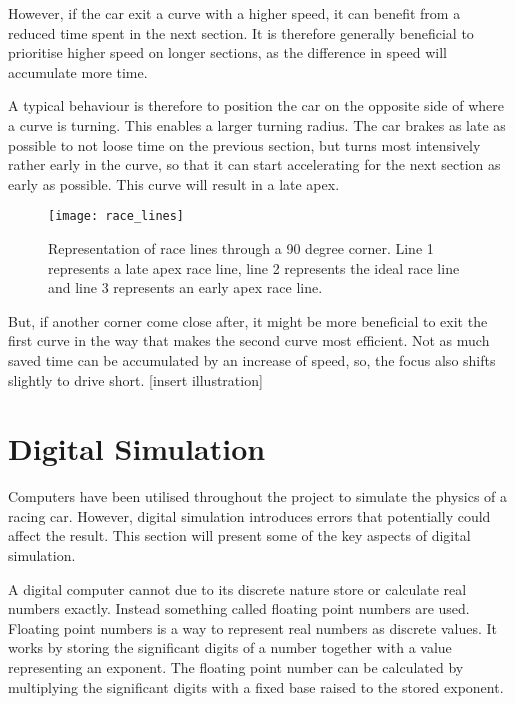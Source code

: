 However, if the car exit a curve with a higher speed, it can benefit from a reduced time spent in the next section. It is therefore generally beneficial to prioritise higher speed on longer sections\cite{beckman:racing_line_intro}, as the difference in speed will accumulate more time.

A typical behaviour is therefore to position the car on the opposite side of where a curve is turning. This enables a larger turning radius. The car brakes as late as possible to not loose time on the previous section, but turns most intensively rather early in the curve, so that it can start accelerating for the next section as early as possible. This curve will result in a late apex.

\begin{figure}[H]
    \centering
    \texttt{[image: race\_lines]}
    \caption{Representation of race lines through a 90 degree corner. Line 1 represents a late apex race line, line 2 represents the ideal race line and line 3 represents an early apex race line.}
\end{figure}

But, if another corner come close after, it might be more beneficial to exit the first curve in the way that makes the second curve most efficient. Not as much saved time can be accumulated by an increase of speed, so, the focus also shifts slightly to drive short. [insert illustration]

\section{Digital Simulation}


Computers have been utilised throughout the project to simulate the physics of a racing car. However, digital simulation introduces errors that potentially could affect the result. This section will present some of the key aspects of digital simulation. 

A digital computer cannot due to its discrete nature store or calculate real numbers exactly. Instead something called floating point numbers are used. Floating point numbers is a way to represent real numbers as discrete values. It works by storing the significant digits of a number together with a value representing an exponent. The floating point number can be calculated by multiplying the significant digits with a fixed base raised to the stored exponent.

